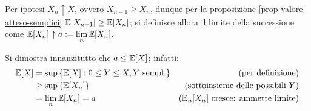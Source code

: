 \begin{dimo}
  Per ipotesi $X_n \uparrow X$, ovvero $X_{n+1} \ge X_n$, dunque per la proposizione \ref{prop-valore-atteso-semplici} $\mathbb E[X_{n+1}] \ge \mathbb E[X_n]$; si definisce allora il limite della successione come $\mathbb E[X_n] \uparrow a \coloneqq \lim\limits_n \mathbb E[X_n]$.

  Si dimostra innanzitutto che \textbf{$a \le \mathbb E[X]$}; infatti:
  \begin{align*}
    \mathbb E[X] &= \sup \left\{ \mathbb E[X]: 0 \le Y \le X, Y \text{ sempl.} \right\}
      &\text{(per definizione)} \\
    &\ge \sup \left\{ \mathbb E[X_n] \right\}
      &\text{(sottoinsieme delle possibili $Y$)} \\
    &= \lim\limits_n \mathbb E[X_n] = a
    &(\mathbb E_n[X_n] \text{ cresce: ammette limite})
  \end{align*}


\end{dimo}
